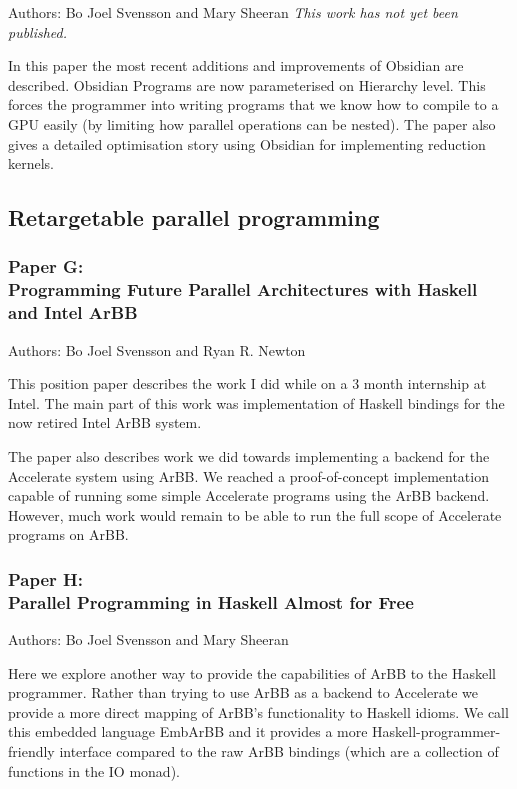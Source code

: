 \documentclass[a4paper]{book}
\newcommand{\paperG}{Paper G}
\newcommand{\paperGTitle}{Programming Future Parallel Architectures with Haskell and Intel ArBB}
\newcommand{\paperH}{Paper H}
\newcommand{\paperHTitle}{Parallel Programming in Haskell Almost for Free}
\begin{document}
Authors: Bo Joel Svensson and Mary Sheeran \newline
\noindent \emph{This work has not yet been published.}
\vspace{5mm} 

\noindent 

In this paper the most recent additions and improvements of Obsidian are 
described. Obsidian Programs are now parameterised on Hierarchy level. This forces
the programmer into writing programs that we know how to compile to a GPU easily 
(by limiting how parallel operations can be nested). The paper also gives a detailed  
optimisation story using Obsidian for implementing reduction kernels. 


\subsection{Retargetable parallel programming} 

\subsubsection{\paperG: \\ \paperGTitle}

Authors: Bo Joel Svensson and Ryan R. Newton

\vspace{5mm}

\noindent This position paper describes the work I did while on a 3 month internship at 
Intel. The main part of this work was implementation of Haskell bindings 
for the now retired Intel ArBB system. 

The paper also describes work we did towards implementing a backend for the 
Accelerate system using ArBB. We reached a proof-of-concept implementation 
capable of running some simple Accelerate programs using the ArBB backend.
However, much work would remain to be able to run the full scope of Accelerate 
programs on ArBB.  

\subsubsection{\paperH: \\ \paperHTitle}

Authors: Bo Joel Svensson and Mary Sheeran 

\vspace{5mm}

\noindent Here we explore another way to provide the capabilities of ArBB to the 
Haskell programmer. Rather than trying to use ArBB as a backend to Accelerate 
we provide a more direct mapping of ArBB's functionality to Haskell idioms. 
We call this embedded language EmbArBB and it provides a more Haskell-programmer-friendly 
interface compared to the raw ArBB bindings (which are a collection of functions 
in the IO monad). 
\end{document}
